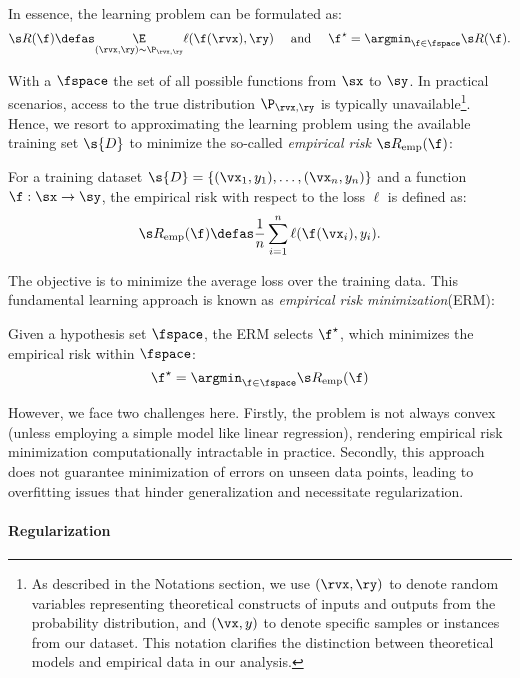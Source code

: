 In essence, the learning problem can be formulated as:
\[
\risk(\f) \defas \underset{(\rvx, \ry) \sim \P_{\rvx,\ry}}{\E}\ell(\f(\rvx), \ry)
~~~~ \text{and} ~~~~
\f^\star = \argmin_{\f \in \fspace} \risk(\f).
\]

With a $\fspace$ the set of all possible functions from $\sx$ to $\sy$. In practical scenarios, access to the true distribution $\P_{\rvx,\ry}$ is typically unavailable\footnote{As described in the Notations section, we use $(\rvx, \ry)$ to denote random variables representing theoretical constructs of inputs and outputs from the probability distribution, and $(\vx, y)$ to denote specific samples or instances from our dataset. This notation clarifies the distinction between theoretical models and empirical data in our analysis.}. Hence, we resort to approximating the learning problem using the available training set $\s{D}$ to minimize the so-called \textit{empirical risk} $\emprisk(\f)$:

\begin{definition}
For a training dataset $\s{D} = \{(\vx_1, y_1), \ldots,  (\vx_n, y_n) \}$ and a function $\f : \sx \to \sy$, the empirical risk with respect to the loss $\ell$ is defined as:
\[
\emprisk(\f) \defas \frac{1}{n}\sum_{i=1}^n \ell(\f(\vx_i), y_i).
\]
\end{definition}

The objective is to minimize the average loss over the training data. This fundamental learning approach is known as \textit{empirical risk minimization}(ERM):

\begin{definition}
Given a hypothesis set $\fspace$, the ERM selects $\f^\star$, which minimizes the empirical risk within $\fspace$:
\[
\f^\star = \argmin_{\f \in \fspace} \emprisk(\f)
\]
\end{definition}

However, we face two challenges here. Firstly, the problem is not always convex (unless employing a simple model like linear regression), rendering empirical risk minimization computationally intractable in practice. Secondly, this approach does not guarantee minimization of errors on unseen data points, leading to overfitting issues that hinder generalization and necessitate regularization.

\paragraph{Regularization}

